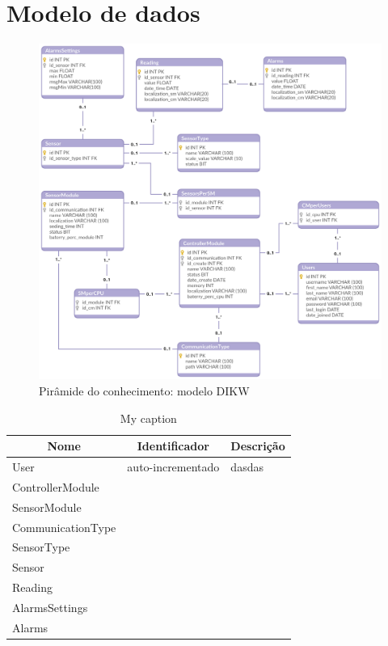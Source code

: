 \newpage
\section{Modelo de dados}


\begin{figure}[!htb]
	\centering
	\includegraphics[scale=0.25]{esquemas/database_tese.pdf}
	\caption{Pirâmide do conhecimento: modelo DIKW}
	\label{db}
\end{figure}


\newpage

\begin{table}[h]
	\centering
	\begin{tabular}{|l|l|l|}
		\hline
		\multicolumn{1}{|c|}{\textbf{Nome}} & \multicolumn{1}{c|}{\textbf{Identificador}} & \multicolumn{1}{c|}{\textbf{Descrição}} \\ \hline
		User & auto-incrementado & dasdas \\ \hline
		ControllerModule&  &  \\ \hline
		SensorModule&  &  \\ \hline
		CommunicationType&  &  \\ \hline
		SensorType&  &  \\ \hline
		Sensor&  &  \\ \hline
		Reading&  &  \\ \hline
		AlarmsSettings&  &  \\ \hline
		Alarms&  &  \\ \hline
	\end{tabular}
	\caption{My caption}
	\label{my-label}
\end{table}









